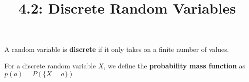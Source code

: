 \documentclass{article}
\title{4.2: Discrete Random Variables}
\begin{document}
\maketitle
\begin{definition}
A random variable is \textbf{discrete} if it only takes on a finite number of values.  
\end{definition}

\begin{definition}
For a discrete random variable $X$, we define the \textbf{probability mass function} as $p(a) = P(\{X=a\})$
\end{definition}
\end{document}
